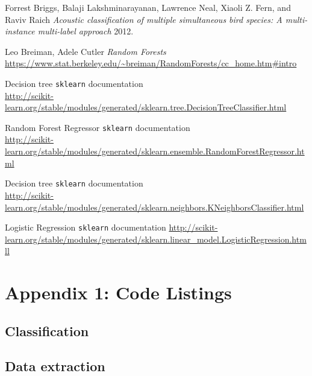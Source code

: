 \documentclass[11pt]{article}
\begin{document}
  \begin{thebibliography}{1}

   Forrest Briggs, Balaji Lakshminarayanan, Lawrence Neal, Xiaoli Z. Fern, and Raviv Raich {\em Acoustic classification of multiple simultaneous bird species: A multi-instance multi-label approach}  2012.

    Leo Breiman, Adele Cutler {\em Random Forests} \\ \url{https://www.stat.berkeley.edu/~breiman/RandomForests/cc_home.htm#intro}

   Decision tree \texttt{sklearn} documentation \\ \url{http://scikit-learn.org/stable/modules/generated/sklearn.tree.DecisionTreeClassifier.html}
  
   Random Forest Regressor \texttt{sklearn} documentation \\ \url{http://scikit-learn.org/stable/modules/generated/sklearn.ensemble.RandomForestRegressor.html}
  
   Decision tree \texttt{sklearn} documentation \\ \url{http://scikit-learn.org/stable/modules/generated/sklearn.neighbors.KNeighborsClassifier.html}
  
     Logistic Regression \texttt{sklearn} documentation \url{http://scikit-learn.org/stable/modules/generated/sklearn.linear_model.LogisticRegression.htmll}
  
  \end{thebibliography}

\section*{Appendix 1: Code Listings}

\subsection*{Classification}


\subsection*{Data extraction}

\end{document}
